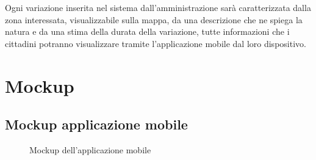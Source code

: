 \documentclass{article}
\begin{document}
Ogni variazione inserita nel sistema dall'amministrazione sarà caratterizzata dalla zona interessata, visualizzabile sulla mappa, da una descrizione che ne spiega la natura e da una stima della durata della variazione, tutte informazioni che i cittadini potranno visualizzare tramite l'applicazione mobile dal loro dispositivo.
\clearpage

\section{Mockup}
\subsection{Mockup applicazione mobile}

\begin{figure}[htbp]
    \centering
    \hspace{100pt}
    \caption{Mockup dell'applicazione mobile}
\end{figure}
\end{document}

